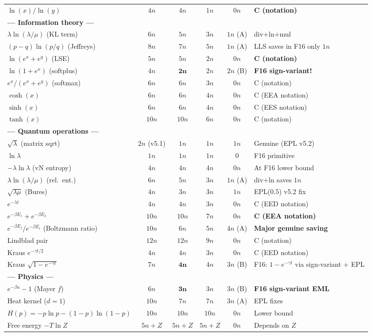 \documentclass[11pt]{article}
\begin{document}
\begin{longtable}{p{5.5cm}ccccl}
$\ln(x)/\ln(y)$ & $4n$ & $4n$ & $1n$ & $0n$ & \textbf{C (notation)} \\
\multicolumn{6}{l}{\textbf{--- Information theory ---}} \\
$\lambda\ln(\lambda/\mu)$ (KL term) & $6n$ & $5n$ & $3n$ & $1n$ (A) & div$+$ln$+$mul \\
$(p-q)\ln(p/q)$ (Jeffreys) & $8n$ & $7n$ & $5n$ & $1n$ (A) & LLS saves in F16 only $1n$ \\
$\ln(e^x+e^y)$ (LSE) & $5n$ & $5n$ & $2n$ & $0n$ & \textbf{C (notation)} \\
$\ln(1+e^x)$ (softplus) & $4n$ & $\mathbf{2n}$ & $2n$ & $2n$ (B) & \textbf{F16 sign-variant!} \\
$e^x/(e^x+e^y)$ (softmax) & $6n$ & $6n$ & $3n$ & $0n$ & C (notation) \\
$\cosh(x)$ & $6n$ & $6n$ & $4n$ & $0n$ & C (EEA notation) \\
$\sinh(x)$ & $6n$ & $6n$ & $4n$ & $0n$ & C (EES notation) \\
$\tanh(x)$ & $10n$ & $10n$ & $6n$ & $0n$ & C (notation) \\
\multicolumn{6}{l}{\textbf{--- Quantum operations ---}} \\
$\sqrt{\lambda}$ (matrix sqrt) & $2n$ (v5.1) & $1n$ & $1n$ & $1n$ & Genuine (EPL v5.2) \\
$\ln\lambda$ & $1n$ & $1n$ & $1n$ & $0$ & F16 primitive \\
$-\lambda\ln\lambda$ (vN entropy) & $4n$ & $4n$ & $4n$ & $0n$ & At F16 lower bound \\
$\lambda\ln(\lambda/\mu)$ (rel.\ ent.) & $6n$ & $5n$ & $3n$ & $1n$ (A) & div$+$ln saves $1n$ \\
$\sqrt{\lambda\mu}$ (Bures) & $4n$ & $3n$ & $3n$ & $1n$ & EPL(0.5) v5.2 fix \\
$e^{-\lambda t}$ & $4n$ & $4n$ & $3n$ & $0n$ & C (EED notation) \\
$e^{-\beta E_1}+e^{-\beta E_2}$ & $10n$ & $10n$ & $7n$ & $0n$ & \textbf{C (EEA notation)} \\
$e^{-\beta E_j}/e^{-\beta E_i}$ (Boltzmann ratio) & $10n$ & $6n$ & $5n$ & $4n$ (A) & \textbf{Major genuine saving} \\
Lindblad pair & $12n$ & $12n$ & $9n$ & $0n$ & C (notation) \\
Kraus $e^{-\gamma t/2}$ & $4n$ & $4n$ & $3n$ & $0n$ & C (EED notation) \\
Kraus $\sqrt{1-e^{-\gamma t}}$ & $7n$ & $\mathbf{4n}$ & $4n$ & $3n$ (B) & F16: $1-e^{-\gamma t}$ via sign-variant + EPL \\
\multicolumn{6}{l}{\textbf{--- Physics ---}} \\
$e^{-\beta u}-1$ (Mayer $f$) & $6n$ & $\mathbf{3n}$ & $3n$ & $3n$ (B) & \textbf{F16 sign-variant EML} \\
Heat kernel ($d=1$) & $10n$ & $7n$ & $7n$ & $3n$ (A) & EPL fixes \\
$H(p)=-p\ln p-(1-p)\ln(1-p)$ & $10n$ & $10n$ & $10n$ & $0n$ & Lower bound \\
Free energy $-T\ln Z$ & $5n+Z$ & $5n+Z$ & $5n+Z$ & $0n$ & Depends on $Z$ \\
\end{longtable}
\end{document}
